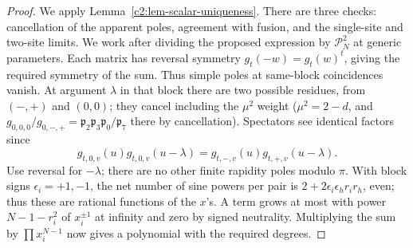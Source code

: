\begin{proof}
We apply Lemma~\ref{c2:lem-scalar-uniqueness}. There are three checks:
cancellation of the apparent poles, agreement with fusion, and the
single-site and two-site limits. We work after dividing the proposed expression by \(\mathcal P_N^2\) at generic parameters. Each matrix has reversal symmetry \(g_t(-w)=g_t(w)^t\), giving the required symmetry of the sum. Thus simple poles at same-block coincidences vanish. At argument \(\lambda\) in that block there are two possible residues, from \((-,+)\) and \((0,0)\); they cancel including the \(\mu^2\) weight (\(\mu^2=2-d\), and \(g_{0,0,0}/g_{0,-,+}=\mathfrak p_2\mathfrak p_3\mathfrak p_0/\mathfrak p_7\) there by cancellation). Spectators see identical factors since
\[
 g_{t,0,v}(u)g_{t,0,v}(u-\lambda)=g_{t,-,v}(u)g_{t,+,v}(u-\lambda).
\]
Use reversal for \(-\lambda\); there are no other finite rapidity poles modulo \(\pi\). With block signs \(\epsilon_i=+1,-1\), the net number of sine powers per pair is \(2+2\epsilon_i\epsilon_h r_i r_h\), even; thus these are rational functions of the \(x\)'s. A term grows at most with power \(N-1-r_i^2\) of \(x_i^{\pm1}\) at infinity and zero by signed neutrality. Multiplying the sum by \(\prod x_i^{N-1}\) now gives a polynomial with the required degrees.


\end{proof}

